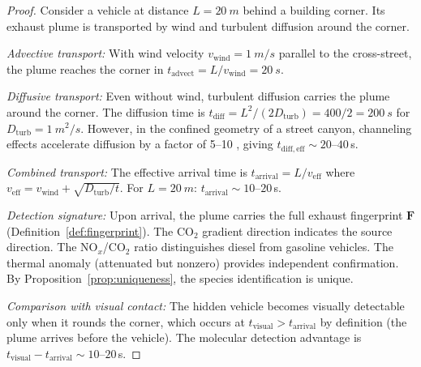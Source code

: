 \documentclass[11pt,twocolumn,a4paper]{article}
\theoremstyle{plain}
\theoremstyle{definition}
\theoremstyle{remark}
\newcommand{\Dturb}{D_{\mathrm{turb}}}
\begin{document}
\begin{proof}
Consider a vehicle at distance $L = \SI{20}{m}$ behind a building corner. Its exhaust plume is transported by wind and turbulent diffusion around the corner.

\emph{Advective transport:} With wind velocity $v_{\mathrm{wind}} = \SI{1}{m/s}$ parallel to the cross-street, the plume reaches the corner in $t_{\mathrm{advect}} = L/v_{\mathrm{wind}} = \SI{20}{s}$.

\emph{Diffusive transport:} Even without wind, turbulent diffusion carries the plume around the corner. The diffusion time is $t_{\mathrm{diff}} = L^2/(2\Dturb) = 400/2 = \SI{200}{s}$ for $\Dturb = \SI{1}{m^2/s}$. However, in the confined geometry of a street canyon, channeling effects accelerate diffusion by a factor of 5--10 \cite{carpentieri2012wind}, giving $t_{\mathrm{diff,eff}} \sim 20$--$40$\,s.

\emph{Combined transport:} The effective arrival time is $t_{\mathrm{arrival}} = L / v_{\mathrm{eff}}$ where $v_{\mathrm{eff}} = v_{\mathrm{wind}} + \sqrt{\Dturb/t}$. For $L = \SI{20}{m}$: $t_{\mathrm{arrival}} \sim 10$--$20$\,s.

\emph{Detection signature:} Upon arrival, the plume carries the full exhaust fingerprint $\mathbf{F}$ (Definition~\ref{def:fingerprint}). The CO$_2$ gradient direction indicates the source direction. The NO$_x$/CO$_2$ ratio distinguishes diesel from gasoline vehicles. The thermal anomaly (attenuated but nonzero) provides independent confirmation. By Proposition~\ref{prop:uniqueness}, the species identification is unique.

\emph{Comparison with visual contact:} The hidden vehicle becomes visually detectable only when it rounds the corner, which occurs at $t_{\mathrm{visual}} > t_{\mathrm{arrival}}$ by definition (the plume arrives before the vehicle). The molecular detection advantage is $t_{\mathrm{visual}} - t_{\mathrm{arrival}} \sim 10$--$20$\,s.
\end{proof}
\end{document}
